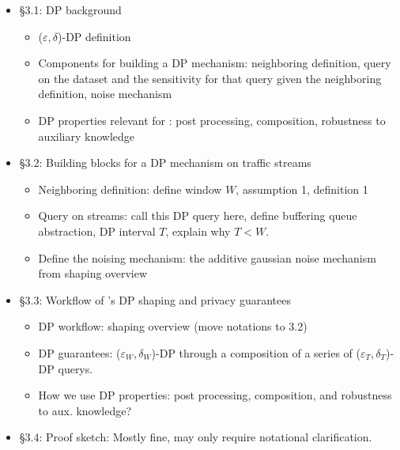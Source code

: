 \noindent
{}
\begin{itemize}
    \item \S 3.1: DP background
    \begin{itemize}
        \item ($\varepsilon, \delta$)-DP definition
        \item Components for building a DP mechanism: neighboring definition,
        query on the dataset and the sensitivity for that query given the
        neighboring definition, noise mechanism
        \item DP properties relevant for {\sys}: post processing, composition,
        robustness to auxiliary knowledge
    \end{itemize}
    \item \S 3.2: Building blocks for a DP mechanism on traffic streams
    \begin{itemize}
        \item Neighboring definition: define window $W$, assumption 1,
        definition 1
        \item Query on streams: call this DP query here, define buffering
        queue abstraction, DP interval $T$, explain why $T < W$.
        \item Define the noising mechanism: the additive gaussian noise
        mechanism from shaping overview
    \end{itemize}
    \item \S 3.3: Workflow of {\sys}'s DP shaping and privacy guarantees
    \begin{itemize}
        \item DP workflow: shaping overview (move notations to 3.2)
        \item DP guarantees: ($\varepsilon_W, \delta_W$)-DP through a
        composition of a series of ($\varepsilon_T, \delta_T$)-DP querys.
        \item How we use DP properties: post processing, composition, and
        robustness to aux. knowledge?
    \end{itemize}
    \item \S 3.4: Proof sketch: Mostly fine, may only require notational
    clarification.
\end{itemize}
\fi


